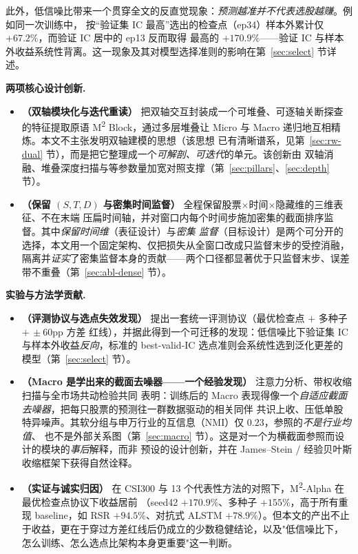 \documentclass[a4paper,11pt,fontset=fandol]{ctexart}
\newcommand{\msq}{\texorpdfstring{M\textsuperscript{2}}{M2}}  %
\newcommand{\msqa}{\texorpdfstring{M\textsuperscript{2}-Alpha}{M2-Alpha}} %
\begin{document}
此外，低信噪比带来一个贯穿全文的反直觉现象：\emph{预测越准并不代表选股越赚}。例如同一次训练中，
按“验证集 IC 最高”选出的检查点（ep34）样本外累计仅 $+67.2\%$，而验证 IC 居中的 ep13 反而取得
最高的 $+170.9\%$——验证 IC 与样本外收益系统性背离。这一现象及其对模型选择准则的影响在第~\ref{sec:select}
节详述。

\noindent\textbf{\heiti 两项核心设计创新.}
\begin{itemize}
  \item \textbf{（双轴模块化与迭代重读）} 把双轴交互封装成一个可堆叠、可逐轴关断探查的特征提取原语
        \msq{} Block，通过多层堆叠让 Micro 与 Macro 递归地互相精炼。本文不主张发明双轴建模的思想（该思想
        已有清晰谱系，见第~\ref{sec:rw-dual} 节），而是把它整理成一个\emph{可解剖、可迭代}的单元。该创新由
        双轴消融、堆叠深度扫描与等参数量加宽对照支撑（第~\ref{sec:pillars}、\ref{sec:depth} 节）。
  \item \textbf{（保留 $(S,T,D)$ 与密集时间监督）} 全程保留股票$\times$时间$\times$隐藏维的三维表征、不在末端
        压扁时间轴，并对窗口内每个时间步施加密集的截面排序监督。其中\emph{保留时间维}（表征设计）与\emph{密集
        监督}（目标设计）是两个可分开的选择，本文用一个固定架构、仅把损失从全窗口改成只监督末步的受控消融，
        隔离并\emph{证实}了密集监督本身的贡献——两个口径都显著优于只监督末步、误差带不重叠（第~\ref{sec:abl-dense} 节）。
\end{itemize}

\noindent\textbf{\heiti 实验与方法学贡献.}
\begin{itemize}
  \item \textbf{（评测协议与选点失效发现）} 提出一套统一评测协议（最优检查点 $+$ 多种子 $+\,\pm60$pp 方差
        红线），并据此得到一个可迁移的发现：低信噪比下验证集 IC 与样本外收益\emph{反向}，标准的 best-valid-IC
        选点准则会系统性选到泛化更差的模型（第~\ref{sec:select} 节）。
  \item \textbf{（Macro 是学出来的截面去噪器——一个经验发现）} 注意力分析、带权收缩扫描与全市场共动检验共同
        表明：训练后的 Macro 表现得像一个\emph{自适应截面去噪器}，把每只股票的预测往一群数据驱动的相关同伴
        共识上收、压低单股特异噪声。其软分组与申万行业的互信息（NMI）仅 $0.23$，参照的\emph{不是行业均值}、
        也不是外部关系图（第~\ref{sec:macro} 节）。这是对一个为横截面参照而设计的模块的\emph{事后}解释，而非
        预设的设计创新，并在 James--Stein / 经验贝叶斯收缩框架下获得自然诠释。
  \item \textbf{（实证与诚实归因）} 在 CSI300 与 13 个代表性方法的对照下，\msqa{} 在最优检查点协议下收益居前
        （seed42 $+170.9\%$、多种子 $+155\%$，高于所有重现 baseline，如 RSR $+94.5\%$、对抗式 ALSTM
        $+78.9\%$）。但本文的产出不止于收益，更在于穿过方差红线后仍成立的少数稳健结论，以及"低信噪比下，
        怎么训练、怎么选点比架构本身更重要"这一判断。
\end{itemize}
\end{document}
